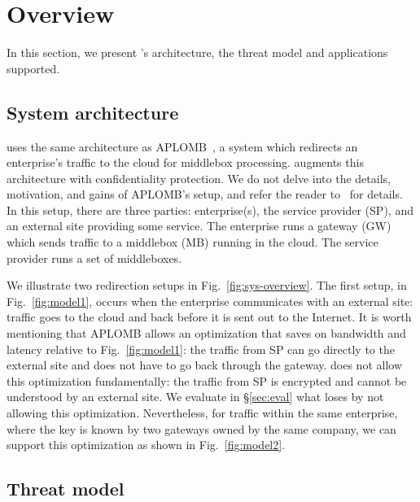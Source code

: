 


     
\section{Overview}\label{sec:overview}








In this section, we present \sys's architecture, the threat model and applications supported.


\subsection{System architecture}

\sys uses the same  architecture as APLOMB~\cite{aplomb}, a system which redirects an enterprise's traffic to the cloud for middlebox processing. \sys augments this architecture with confidentiality protection.
We do not delve into the details, motivation, and gains of APLOMB's setup, and refer the reader to~\cite{aplomb} for details. 
In this setup, there are three parties: enterprise(s), the service provider (SP), and an external site providing
some service. The enterprise runs a gateway (GW) which sends traffic to a middlebox (MB) running in the cloud.
The service provider runs a set of middleboxes. 

We illustrate two redirection setups in Fig.~\ref{fig:sys-overview}.  The first setup, in Fig.~\ref{fig:model1},  occurs when the enterprise communicates with an external site: traffic goes to the cloud and back before it is sent out to the Internet. 
It is worth mentioning that APLOMB allows an optimization that saves on bandwidth and latency relative to Fig.~\ref{fig:model1}: the traffic from SP can go directly to the external site and does not have to go back through the gateway. \sys does not allow this optimization fundamentally: the traffic from SP is encrypted and cannot be understood by an external site. We evaluate in \S\ref{sec:eval} what \sys loses by not allowing this optimization. 
Nevertheless, for traffic within the same enterprise, where the key is known by two gateways owned by the same company, we can support this optimization as shown in Fig.~\ref{fig:model2}.



\subsection{Threat model}

